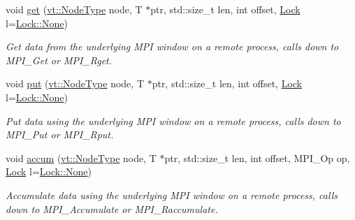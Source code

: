 \begin{DoxyCompactItemize}
void \hyperlink{structvt_1_1rdma_1_1_handle_3_01_t_00_01_e_00_01_index_t_00_01typename_01std_1_1enable__if__t_3_d15dac1b5db6e2bc0fb0b8aca42b1456_a0f8e9a21c754f0006c910a9d6325880f}{get} (\hyperlink{namespacevt_a866da9d0efc19c0a1ce79e9e492f47e2}{vt\+::\+Node\+Type} node, T $\ast$ptr, std\+::size\+\_\+t len, int offset, \hyperlink{namespacevt_1_1rdma_ac5c20b41a653e520b6305d4d454ecb70}{Lock} l=\hyperlink{namespacevt_1_1rdma_ac5c20b41a653e520b6305d4d454ecb70a6adf97f83acf6453d4a6a4b1070f3754}{Lock\+::\+None})
\begin{DoxyCompactList}\small\item\em Get data from the underlying M\+PI window on a remote process, calls down to {\ttfamily M\+P\+I\+\_\+\+Get} or {\ttfamily M\+P\+I\+\_\+\+Rget}. \end{DoxyCompactList}\item 
void \hyperlink{structvt_1_1rdma_1_1_handle_3_01_t_00_01_e_00_01_index_t_00_01typename_01std_1_1enable__if__t_3_d15dac1b5db6e2bc0fb0b8aca42b1456_a320194a1c7de498bcb788854eb5617b5}{put} (\hyperlink{namespacevt_a866da9d0efc19c0a1ce79e9e492f47e2}{vt\+::\+Node\+Type} node, T $\ast$ptr, std\+::size\+\_\+t len, int offset, \hyperlink{namespacevt_1_1rdma_ac5c20b41a653e520b6305d4d454ecb70}{Lock} l=\hyperlink{namespacevt_1_1rdma_ac5c20b41a653e520b6305d4d454ecb70a6adf97f83acf6453d4a6a4b1070f3754}{Lock\+::\+None})
\begin{DoxyCompactList}\small\item\em Put data using the underlying M\+PI window on a remote process, calls down to {\ttfamily M\+P\+I\+\_\+\+Put} or {\ttfamily M\+P\+I\+\_\+\+Rput}. \end{DoxyCompactList}\item 
void \hyperlink{structvt_1_1rdma_1_1_handle_3_01_t_00_01_e_00_01_index_t_00_01typename_01std_1_1enable__if__t_3_d15dac1b5db6e2bc0fb0b8aca42b1456_a7438912de64870912ba09f292d0b3679}{accum} (\hyperlink{namespacevt_a866da9d0efc19c0a1ce79e9e492f47e2}{vt\+::\+Node\+Type} node, T $\ast$ptr, std\+::size\+\_\+t len, int offset, M\+P\+I\+\_\+\+Op op, \hyperlink{namespacevt_1_1rdma_ac5c20b41a653e520b6305d4d454ecb70}{Lock} l=\hyperlink{namespacevt_1_1rdma_ac5c20b41a653e520b6305d4d454ecb70a6adf97f83acf6453d4a6a4b1070f3754}{Lock\+::\+None})
\begin{DoxyCompactList}\small\item\em Accumulate data using the underlying M\+PI window on a remote process, calls down to {\ttfamily M\+P\+I\+\_\+\+Accumulate} or {\ttfamily M\+P\+I\+\_\+\+Raccumulate}. \end{DoxyCompactList}\item 

\end{DoxyCompactItemize}
